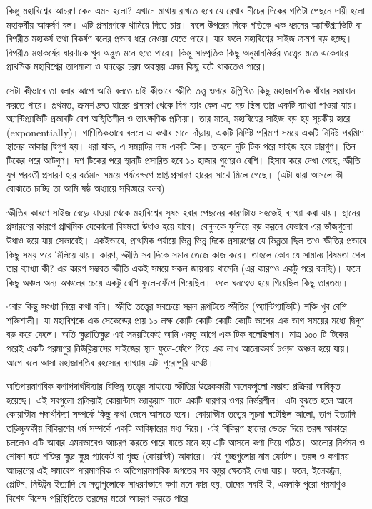 \documentclass[
]{book}
\begin{document}
কিন্তু মহাবিশ্বের আচরণ কেন এমন হলো? এখানে মাথায় রাখতে হবে যে রেখার নীচের দিকের গতিটা পেছনে দায়ী হলো মহাকর্ষীয় আকর্ষণ বল। এটি প্রসারণকে থামিয়ে দিতে চায়। ফলে উপরের দিকে গতিকে এক ধরনের অ্যান্টিগ্র্যাভিটি বা বিপরীত মহাকর্ষ তথা বিকর্ষণ বলের প্রভাব ধরে নেওয়া যেতে পারে। যার ফলে মহাবিশ্বের সাইজ ক্রমশ বড় হচ্ছে। বিপরীত মহাকর্ষের ধারণাকে খুব অদ্ভুত মনে হতে পারে। কিন্তু সাম্প্রতিক কিছু অনুমাননির্ভর তত্ত্বের মতে একেবারে প্রাথমিক মহাবিশ্বের তাপমাত্রা ও ঘনত্বের চরম অবস্থায় এমন কিছু ঘটে থাকতেও পারে।

সেটা কীভাবে তা বলার আগে আমি বলতে চাই কীভাবে স্ফীতি তত্ত্ব ওপরে উল্লিখিত কিছু মহাজাগতিক ধাঁধার সমাধান করতে পারে। প্রথমত, ক্রমশ দ্রুত হারের প্রসারণ থেকে বিগ ব্যাং কেন এত বড় ছিল তার একটি ব্যাখ্যা পাওয়া যায়। অ্যান্টিগ্র্যাভিটি প্রভাবটি বেশ অস্থিতিশীল ও তাৎক্ষণিক প্রক্রিয়া। তার মানে, মহাবিশ্বের সাইজ বড় হয় সূচকীয় হারে (exponentially)। গাণিতিকভাবে বললে এ কথার মানে দাঁড়ায়, একটি নির্দিষ্ট পরিমাণ সময়ে একটি নির্দিষ্ট পরমািণ স্থানের আকার দ্বিগুণ হয়। ধরা যাক, এ সময়টির নাম একটি টিক। তাহলে দুটি টিক পরে সাইজ হবে চারগুণ। তিন টিকের পরে আটগুণ। দশ টিকের পরে স্থানটি প্রসারিত হবে ১০ হাজার গুণেরও বেশি। হিসাব করে দেখা গেছে, স্ফীতি যুগ পরবর্তী প্রসারণ হার বর্তমান সময়ে পর্যবেক্ষণে প্রাপ্ত প্রসারণ হারের সাথে মিলে গেছে। (এটা দ্বারা আসলে কী বোঝাতে চাচ্ছি তা আমি ষষ্ঠ অধ্যায়ে সবিস্তারে বলব)

স্ফীতির কারণে সাইজ বেড়ে যাওয়া থেকে মহাবিশ্বের সুষম হবার পেছনের কারণটাও সহজেই ব্যাখ্যা করা যায়। স্থানের প্রসারণের কারণে প্রাথমিক যেকোনো বিষমতা উধাও হয়ে যাবে। বেলুনকে ফুলিয়ে বড় করলে যেভাবে এর ভাঁজগুলো উধাও হয়ে যায় সেভাবেই। একইভাবে, প্রাথমিক পর্যায়ে ভিন্ন ভিন্ন দিকে প্রসারণের যে ভিন্নতা ছিল তাও স্ফীতির প্রভাবে কিছু সময় পরে মিলিয়ে যায়। কারণ, স্ফীতি সব দিকে সমান তেজে কাজ করে। তাহলে কোব যে সামান্য বিষমতা পেল তার ব্যাখ্যা কী? এর কারণ সম্ভবত স্ফীতি একই সময়ে সকল জায়গায় থামেনি (এর কারণও একটু পরে বলছি)। ফলে কিছু অঞ্চল অন্য অঞ্চলের চেয়ে একটু বেশি ফুলে-ফেঁপে গিয়েছিল। ফলে ঘনত্বেও হয়ে গিয়েছিল কিছু তারতম্য।

এবার কিছু সংখ্যা নিয়ে কথা বলি। স্ফীতি তত্ত্বের সবচেয়ে সরল রূপটিতে স্ফীতির (অ্যান্টিগ্যাভিটি) শক্তি খুব বেশি শক্তিশালী। যা মহাবিশ্বকে এক সেকেন্ডের প্রায় ১০ লক্ষ কোটি কোটি কোটি কোটি ভাগের এক ভাগ সময়ের মধ্যে দ্বিগুণ বড় করে ফেলে। অতি ক্ষুদ্রাতিক্ষুদ্র এই সময়টিকেই আমি একটু আগে এক টিক বলেছিলাম। মাত্র ১০০ টি টিকের পরেই একটি পরমাণুর নিউক্লিয়াসের সাইজের স্থান ফুলে-ফেঁপে গিয়ে এক লাখ আলোকবর্ষ চওড়া অঞ্চল হয়ে যায়। আগে বলে আসা মহাজাগতিব রহস্যের ব্যাখ্যায় এটা পুরোপুরি যথেষ্ট।

অতিপারমাণবিক কণাপদার্থবিদ্যার বিভিন্ন তত্ত্বের সাহায্যে স্ফীতির উদ্রেককারী অনেকগুলো সম্ভাব্য প্রক্রিয়া আবিষ্কৃত হয়েছে। এই সবগুলো প্রক্রিয়াই কোয়ান্টাম ভ্যাকুয়াম নামে একটি ধারণার ওপর নির্ভরশীল। এটা বুঝতে হলে আগে কোয়ান্টাম পদার্থবিদ্যা সম্পর্কে কিছু কথা জেনে আসতে হবে। কোয়ান্টাম তত্ত্বের সূচনা ঘটেছিল আলো, তাপ ইত্যাদি তড়িচ্চুম্বকীয় বিকিরণের ধর্ম সম্পর্কে একটি আবিষ্কারের মধ্য দিয়ে। এই বিকিরণ স্থানের ভেতর দিয়ে তরঙ্গ আকারে চললেও এটি আবার এমনভাবেও আচরণ করতে পারে যাতে মনে হয় এটি আসলে কণা দিয়ে গঠিত। আলোর নির্গমন ও শোষণ ঘটে শক্তির ক্ষুদ্র ক্ষুদ্র প্যাকেট বা গুচ্ছ (কোয়ান্টা) আকারে। এই গুচ্ছগুলোর নাম ফোটন। তরঙ্গ ও কণাময় আচরণের এই সমাবেশ পারমাণবিক ও অতিপারমাণবিক জগতের সব বস্তুর ক্ষেত্রেই দেখা যায়। ফলে, ইলেকট্রন, প্রোটন, নিউট্রন ইত্যাদি যে সত্ত্বাগুলোকে সাধরণভাবে কণা মনে কার হয়, তাদের সবাই-ই, এমনকি পুরো পরমাণুও বিশেষ বিশেষ পরিস্থিতিতে তরঙ্গের মতো আচরণ করতে পারে।
\end{document}
